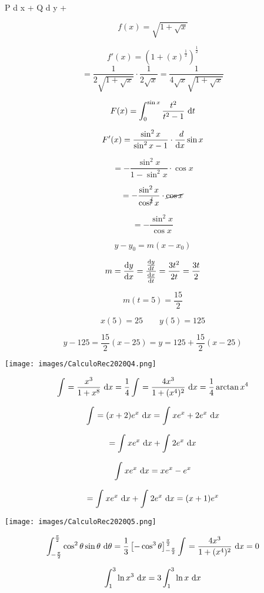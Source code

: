 \documentclass{scrartcl}
\DeclareRobustCommand*\d
{\ifmmode\mathop{}\!\mathrm{d}\else\expandafter\originald\fi}
\begin{document}
P
d
x
+
Q
d
y
+


	
	\[f(x)=\sqrt{{1+\sqrt{x}}}\]
	
	\[f'(x)=(1+(x)^{\frac{1}{2}})^{\frac{1}{2}}\]
	\[= \frac{1}{2\sqrt{1+\sqrt{x}}} \cdot \frac{1}{2\sqrt{x}} = \frac{1}{4\sqrt{x}\sqrt{1+\sqrt{x}}}\]
	
	\[F(x)=\int_{0}^{\sin{x}}\frac{t^2}{t^2-1} \, \d t\]
	
	\[F'(x) = \frac{\sin^2{x}}{\sin^2{x}-1} \cdot \frac{\ d}{\d x} \sin{x} \]
	
	\[= - \frac{\sin^2{x}}{1-\sin^2{x} } \cdot \cos{x} \]
	
	\[= - \frac{\sin^2{x}}{\cos^{\cancel{2}}{x} } \cdot \cancel{\cos{x}} \]
	
	\[= - \frac{\sin^2{x}}{\cos{x}} \]
	
	
	
	\[y-y_0 = m(x-x_0)\]
	
	\[m = \frac{\d y}{\d x} = \frac{\frac{\d y}{\d t}}{\frac{\d x}{\d t}} = \frac{3t^2}{2t}=\frac{3t}{2}\]
	
	\[m(t=5) = \frac{15}{2}\]
	
	\[x(5)=25 \qquad y(5)=125\]
	
	\[y-125=\frac{15}{2}(x-25) = y = 125 + \frac{15}{2}(x-25)\]
	
	\texttt{[image: images/CalculoRec2020Q4.png]}
	
	\[\int_{}^{}=\frac{x^3}{1+x^8} \, \d x = \frac{1}{4} \int_{}^{}=\frac{4x^3}{1+(x^4)^2} \, \d x = \frac{1}{4} \arctan{x^4}\]
	
	\[\int_{}^{}=(x+2)e^x \, \d x = \int_{}^{} xe^x+2e^x \, \d x \]
	
	\[= \int_{}^{} xe^x \, \d x + \int_{}^{} 2e^x \, \d x \]
	
	\[\int_{}^{} xe^x \, \d x = xe^x - e^x\]
	
	\[= \int_{}^{} xe^x \, \d x  + \int_{}^{} 2e^x \, \d x  = (x+1)e^x\]
	
	
	\texttt{[image: images/CalculoRec2020Q5.png]}
	
	
	\[\int_{-\frac{\pi}{2}}^{\frac{\pi}{2}} \cos^2{\theta}\sin{\theta} \, \d \theta = \frac{1}{3}\left[-\cos^3{\theta}\right]_{-\frac{\pi}{2}}^{\frac{\pi}{2}} \int_{}^{}=\frac{4x^3}{1+(x^4)^2} \, \d x = 0\]
	
	\[\int_{1}^{3} \ln{x^3} \, \d x = 3 \int_{1}^{3} \ln{x} \, \d x \]
	
\end{document}
